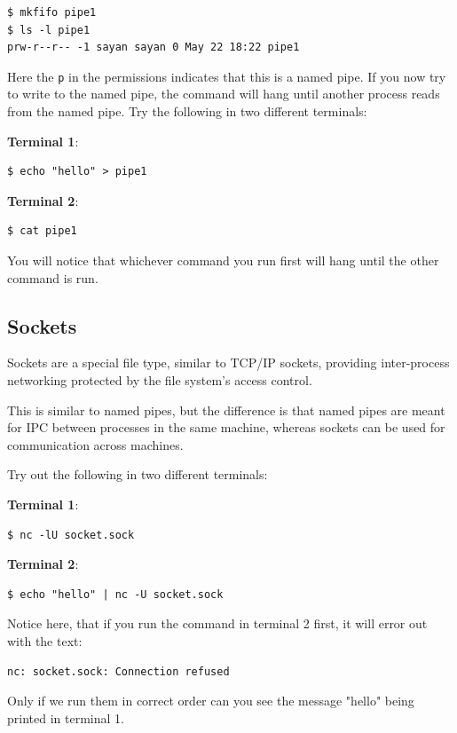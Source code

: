 \begin{lstlisting}
$ mkfifo pipe1
$ ls -l pipe1
prw-r--r-- -1 sayan sayan 0 May 22 18:22 pipe1
\end{lstlisting}

Here the \texttt{p} in the permissions indicates that this is a named pipe.
If you now try to write to the named pipe, the command will hang until another process reads from the named pipe.
Try the following in two different terminals:

\textbf{Terminal 1}:
\begin{lstlisting}
$ echo "hello" > pipe1
\end{lstlisting}

\textbf{Terminal 2}:
\begin{lstlisting}
$ cat pipe1
\end{lstlisting}

You will notice that whichever command you run first will hang until the other command is run.

\subsection{Sockets}

Sockets are a special file type, similar to TCP/IP sockets, providing inter-process networking protected by the file system's access control.

This is similar to named pipes, but the difference is that named pipes are meant for IPC between processes in the same machine, whereas sockets can be used for communication across machines.

Try out the following in two different terminals:

\textbf{Terminal 1}:
\begin{lstlisting}
$ nc -lU socket.sock
\end{lstlisting}

\textbf{Terminal 2}:
\begin{lstlisting}
$ echo "hello" | nc -U socket.sock
\end{lstlisting}

Notice here, that if you run the command in terminal 2 first, it will error out with the text:
\begin{lstlisting}
nc: socket.sock: Connection refused
\end{lstlisting}

Only if we run them in correct order can you see the message "hello" being printed in terminal 1.

